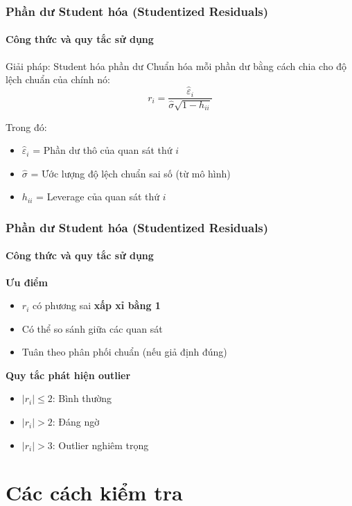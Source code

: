 \begin{frame}
    \frametitle{Phần dư Student hóa (Studentized Residuals)}
    \framesubtitle{Công thức và quy tắc sử dụng}
    
    \begin{block}{Giải pháp: Student hóa phần dư}
        Chuẩn hóa mỗi phần dư bằng cách chia cho độ lệch chuẩn của chính nó:
        \[
        r_i = \frac{\widehat{\varepsilon}_i}{\widehat{\sigma}\sqrt{1 - h_{ii}}}
        \]
        
        Trong đó:
        \begin{itemize}
            \item $\widehat{\varepsilon}_i$ = Phần dư thô của quan sát thứ $i$
            \item $\widehat{\sigma}$ = Ước lượng độ lệch chuẩn sai số (từ mô hình)
            \item $h_{ii}$ = Leverage của quan sát thứ $i$
        \end{itemize}
    \end{block}
\end{frame}

\begin{frame}
    \frametitle{Phần dư Student hóa (Studentized Residuals)}
    \framesubtitle{Công thức và quy tắc sử dụng}
    
    \textbf{Ưu điểm}
    \begin{itemize}
        \item $r_i$ có phương sai \textbf{xấp xỉ bằng 1}
        \item Có thể so sánh giữa các quan sát
        \item Tuân theo phân phối chuẩn (nếu giả định đúng)
    \end{itemize}

    \textbf{Quy tắc phát hiện outlier}
    \begin{itemize}
        \item $|r_i| \leq 2$: Bình thường
        \item $|r_i| > 2$: Đáng ngờ
        \item $|r_i| > 3$: Outlier nghiêm trọng
    \end{itemize}
\end{frame}

\section{Các cách kiểm tra}

